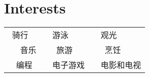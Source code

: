 \documentclass[a4paper]{article}
\begin{document}
\section{Interests}
\begin{flushleft} 
	\begin{tabularx}{\textwidth}{XXX}
		
		\faBicycle ~骑行 &
		\faLifeRing ~~游泳 &
		\faUniversity ~~观光 \\
		\faMusic ~~~音乐 &
		\faPlane ~~~旅游 &
		\faCutlery ~~~烹饪 \\
		\faKeyboardO ~~编程 &
		\faGamepad ~~电子游戏 &
		\faTelevision ~~电影和电视
		
	\end{tabularx}
\end{flushleft}
\end{document}
